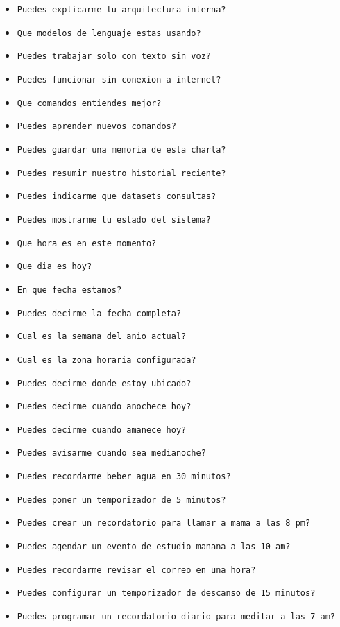 \documentclass[a4paper,12pt]{article}
\begin{document}
\begin{itemize}
    \item \texttt{Puedes explicarme tu arquitectura interna?}
    \item \texttt{Que modelos de lenguaje estas usando?}
    \item \texttt{Puedes trabajar solo con texto sin voz?}
    \item \texttt{Puedes funcionar sin conexion a internet?}
    \item \texttt{Que comandos entiendes mejor?}
    \item \texttt{Puedes aprender nuevos comandos?}
    \item \texttt{Puedes guardar una memoria de esta charla?}
    \item \texttt{Puedes resumir nuestro historial reciente?}
    \item \texttt{Puedes indicarme que datasets consultas?}
    \item \texttt{Puedes mostrarme tu estado del sistema?}
    \item \texttt{Que hora es en este momento?}
    \item \texttt{Que dia es hoy?}
    \item \texttt{En que fecha estamos?}
    \item \texttt{Puedes decirme la fecha completa?}
    \item \texttt{Cual es la semana del anio actual?}
    \item \texttt{Cual es la zona horaria configurada?}
    \item \texttt{Puedes decirme donde estoy ubicado?}
    \item \texttt{Puedes decirme cuando anochece hoy?}
    \item \texttt{Puedes decirme cuando amanece hoy?}
    \item \texttt{Puedes avisarme cuando sea medianoche?}
    \item \texttt{Puedes recordarme beber agua en 30 minutos?}
    \item \texttt{Puedes poner un temporizador de 5 minutos?}
    \item \texttt{Puedes crear un recordatorio para llamar a mama a las 8 pm?}
    \item \texttt{Puedes agendar un evento de estudio manana a las 10 am?}
    \item \texttt{Puedes recordarme revisar el correo en una hora?}
    \item \texttt{Puedes configurar un temporizador de descanso de 15 minutos?}
    \item \texttt{Puedes programar un recordatorio diario para meditar a las 7 am?}

\end{itemize}
\end{document}
